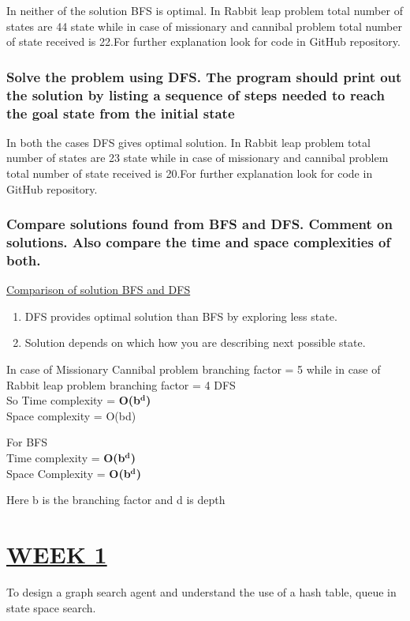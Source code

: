 \documentclass[15pt,journal]{IEEEtran}
\begin{document}
In neither of the solution  BFS is optimal. In Rabbit leap problem total number of states are 44 state while in case of missionary and cannibal problem total number of state received is 22.For further explanation look for code in GitHub repository.

\subsubsection{Solve the problem using DFS.  The program should print out the solution by listing a sequence of steps needed to reach the goal state from the initial state}
In both the cases DFS gives optimal solution. In Rabbit leap problem total number of states are 23 state while in case of missionary and cannibal problem total number of state received is 20.For further explanation look for code in GitHub repository.

\subsubsection{Compare solutions found from BFS and DFS.  Comment on solutions. Also compare the time and space complexities of both.}

\underline{Comparison of solution BFS and DFS}
\begin{enumerate}
    \item DFS provides optimal solution than BFS by exploring less state.
    \item Solution depends on which how you are describing next possible state.
\end{enumerate}

In case of Missionary Cannibal problem branching factor = 5 while in case of Rabbit leap problem branching factor = 4
DFS \\
So Time complexity = {\bf{O(b{{$\bm{^{d}}$)}}}}\\
Space complexity = O(bd)

For BFS\\
Time complexity = {\bf{O(b{{$\bm{^{d}}$)}}}}\\
Space Complexity = {\bf{O(b{{$\bm{^{d}}$)}}}}

Here b is the branching factor and d is depth





\section{\large{\underline{WEEK 1}}}
 To design a graph search agent and understand the use of a hash table, queue in state space search.
 
\end{document}
